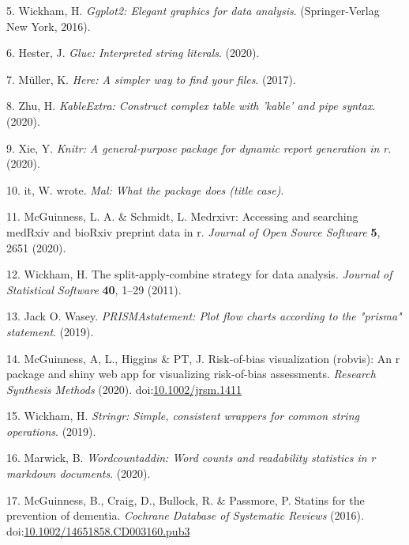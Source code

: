 \documentclass[a4paper, twoside]{templates/ociamthesis}
\begin{document}
\leavevmode\hypertarget{ref-ggplot2}{}%
5. Wickham, H. \emph{Ggplot2: Elegant graphics for data analysis}. (Springer-Verlag New York, 2016).

\leavevmode\hypertarget{ref-glue}{}%
6. Hester, J. \emph{Glue: Interpreted string literals}. (2020).

\leavevmode\hypertarget{ref-here}{}%
7. Müller, K. \emph{Here: A simpler way to find your files}. (2017).

\leavevmode\hypertarget{ref-kableExtra}{}%
8. Zhu, H. \emph{KableExtra: Construct complex table with 'kable' and pipe syntax}. (2020).

\leavevmode\hypertarget{ref-knitr}{}%
9. Xie, Y. \emph{Knitr: A general-purpose package for dynamic report generation in r}. (2020).

\leavevmode\hypertarget{ref-mal}{}%
10. it, W. wrote. \emph{Mal: What the package does (title case)}.

\leavevmode\hypertarget{ref-medrxivr}{}%
11. McGuinness, L. A. \& Schmidt, L. Medrxivr: Accessing and searching medRxiv and bioRxiv preprint data in r. \emph{Journal of Open Source Software} \textbf{5}, 2651 (2020).

\leavevmode\hypertarget{ref-plyr}{}%
12. Wickham, H. The split-apply-combine strategy for data analysis. \emph{Journal of Statistical Software} \textbf{40}, 1--29 (2011).

\leavevmode\hypertarget{ref-PRISMAstatement}{}%
13. Jack O. Wasey. \emph{PRISMAstatement: Plot flow charts according to the "prisma" statement}. (2019).

\leavevmode\hypertarget{ref-robvis}{}%
14. McGuinness, A, L., Higgins \& PT, J. Risk-of-bias visualization (robvis): An r package and shiny web app for visualizing risk-of-bias assessments. \emph{Research Synthesis Methods} (2020). doi:\href{https://doi.org/10.1002/jrsm.1411}{10.1002/jrsm.1411}

\leavevmode\hypertarget{ref-stringr}{}%
15. Wickham, H. \emph{Stringr: Simple, consistent wrappers for common string operations}. (2019).

\leavevmode\hypertarget{ref-wordcountaddin}{}%
16. Marwick, B. \emph{Wordcountaddin: Word counts and readability statistics in r markdown documents}. (2020).

\leavevmode\hypertarget{ref-mcguinness2016b}{}%
17. McGuinness, B., Craig, D., Bullock, R. \& Passmore, P. Statins for the prevention of dementia. \emph{Cochrane Database of Systematic Reviews} (2016). doi:\href{https://doi.org/10.1002/14651858.CD003160.pub3}{10.1002/14651858.CD003160.pub3}
\end{document}
